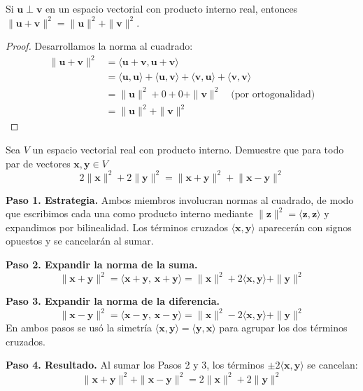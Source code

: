 \begin{theorem}
Si $\mathbf{u} \perp \mathbf{v}$ en un espacio vectorial con producto interno real, entonces \(
\|\mathbf{u} + \mathbf{v}\|^2 = \|\mathbf{u}\|^2 + \|\mathbf{v}\|^2
.\)
\begin{proof}
Desarrollamos la norma al cuadrado:
\begin{align*}
\|\mathbf{u} + \mathbf{v}\|^2 &= \langle \mathbf{u} + \mathbf{v}, \mathbf{u} + \mathbf{v} \rangle \\
&= \langle \mathbf{u}, \mathbf{u} \rangle + \langle \mathbf{u}, \mathbf{v} \rangle + \langle \mathbf{v}, \mathbf{u} \rangle + \langle \mathbf{v}, \mathbf{v} \rangle \\
&= \|\mathbf{u}\|^2 + 0 + 0 + \|\mathbf{v}\|^2 \quad \text{(por ortogonalidad)} \\
&= \|\mathbf{u}\|^2 + \|\mathbf{v}\|^2
\end{align*}
\end{proof}
\end{theorem}

\begin{example}
Sea $V$ un espacio vectorial real con producto interno. Demuestre que para todo par de vectores $\mathbf{x}, \mathbf{y} \in V$
\[
2\lVert \mathbf{x} \rVert^2+2\lVert \mathbf{y} \rVert^2=\lVert \mathbf{x+y} \rVert^2+\lVert \mathbf{x-y} \rVert^2
\]
\begin{myproof}
\textbf{Paso 1. Estrategia.} Ambos miembros involucran normas al cuadrado, de modo que escribimos cada una como producto interno mediante $\|\mathbf{z}\|^2 = \langle \mathbf{z}, \mathbf{z} \rangle$ y expandimos por bilinealidad. Los términos cruzados $\langle \mathbf{x}, \mathbf{y} \rangle$ aparecerán con signos opuestos y se cancelarán al sumar.

\textbf{Paso 2. Expandir la norma de la suma.}
\[
\|\mathbf{x} + \mathbf{y}\|^2 = \langle \mathbf{x}+\mathbf{y},\, \mathbf{x}+\mathbf{y} \rangle = \|\mathbf{x}\|^2 + 2\langle \mathbf{x}, \mathbf{y} \rangle + \|\mathbf{y}\|^2
\]

\textbf{Paso 3. Expandir la norma de la diferencia.}
\[
\|\mathbf{x} - \mathbf{y}\|^2 = \langle \mathbf{x}-\mathbf{y},\, \mathbf{x}-\mathbf{y} \rangle = \|\mathbf{x}\|^2 - 2\langle \mathbf{x}, \mathbf{y} \rangle + \|\mathbf{y}\|^2
\]
En ambos pasos se usó la simetría $\langle \mathbf{x}, \mathbf{y} \rangle = \langle \mathbf{y}, \mathbf{x} \rangle$ para agrupar los dos términos cruzados.

\textbf{Paso 4. Resultado.} Al sumar los Pasos 2 y 3, los términos $\pm 2\langle \mathbf{x}, \mathbf{y} \rangle$ se cancelan:
\[
\boxed{\|\mathbf{x} + \mathbf{y}\|^2 + \|\mathbf{x} - \mathbf{y}\|^2 = 2\|\mathbf{x}\|^2 + 2\|\mathbf{y}\|^2}
\]
\end{myproof}
\end{example}

